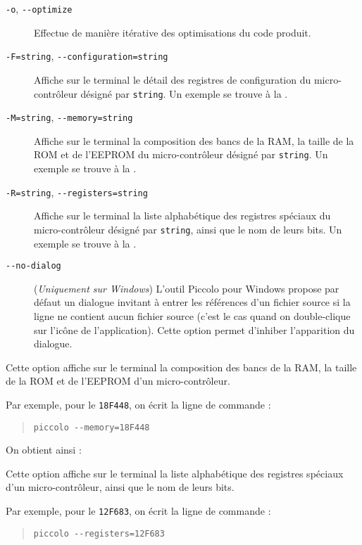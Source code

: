 \begin{description}
  \item[\texttt{-o}, \texttt{-{-}optimize}] Effectue de manière itérative des optimisations du code produit.
  \item[\texttt{-F=string}, \texttt{-{-}configuration=string}] Affiche sur le terminal le détail des registres de configuration du micro-contrôleur désigné par \texttt{string}. Un exemple se trouve à la .
  \item[\texttt{-M=string}, \texttt{-{-}memory=string}] Affiche sur le terminal la composition des bancs de la RAM, la taille de la ROM et de l’EEPROM du micro-contrôleur désigné par \texttt{string}. Un exemple se trouve à la .
  \item[\texttt{-R=string}, \texttt{-{-}registers=string}] Affiche sur le terminal la liste alphabétique des registres spéciaux du micro-contrôleur désigné par \texttt{string}, ainsi que le nom de leurs bits. Un exemple se trouve à la .
  \item[\texttt{-{-}no-dialog}] (\emph{Uniquement sur Windows}) L’outil Piccolo pour Windows propose par défaut un dialogue invitant à entrer les références d’un fichier source si la ligne ne contient aucun fichier source (c’est le cas quand on double-clique sur l’icône de l’application). Cette option permet d'inhiber l’apparition du dialogue.
\end{description}


Cette option affiche sur le terminal la composition des bancs de la RAM, la taille de la ROM et de l’EEPROM d'un micro-contrôleur.

Par exemple, pour le \texttt{18F448}, on écrit la ligne de commande :
\begin{quote}
  \texttt{piccolo -{}-memory=18F448}
\end{quote}

On obtient ainsi : 
{\footnotesize }



Cette option affiche sur le terminal la liste alphabétique des registres spéciaux d'un micro-contrôleur, ainsi que le nom de leurs bits.

Par exemple, pour le \texttt{12F683}, on écrit la ligne de commande :
\begin{quote}
  \texttt{piccolo -{}-registers=12F683}
\end{quote}

